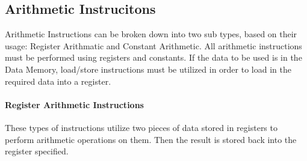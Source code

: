 \subsection{Arithmetic Instrucitons}
Arithmetic Instructions can be broken down into two sub types, based on their usage:
Register Arithmatic and Constant Arithmetic. All arithmetic instructions must be performed
using registers and constants. If the data to be used is in the Data Memory, load/store instructions
must be utilized in order to load in the required data into a register.

\paragraph*{Register Arithmetic Instructions}
These types of instructions utilize two pieces of data stored in registers to perform arithmetic
operations on them. Then the result is stored back into the register specified.

\begin{table}[!h]
    \centering
    \caption{Register Arithmetic Instructions}
    \label{table:register_arithmatic_instructions}
\end{table}

